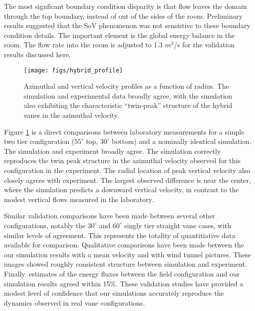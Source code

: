The most signficant boundary condition disparity is that
flow leaves the domain through the top boundary, instead of out
of the sides of the room. Preliminary results suggested that the SoV phenomenon 
was not sensistive to these boundary condition details. The important element is the 
global energy balance in the room. The flow rate into the room is adjusted to 
1.3 $m^3$/s for the validation results discussed here. 


  \begin{figure}[!htb]
    \begin{center}
     \texttt{[image: figs/hybrid\_profile]}
     \caption{Azimuthal and vertical velocity profiles as a function of
     radius. The simulation and experimental data broadly agree, with
     the simulation also exhibiting the characteristic ``twin-peak''
     structure of the hybrid vanes in the azimuthal velocity. }
     \label{fig:lab}
    \end{center}
  \end{figure}

Figure \ref{fig:lab} is a direct comparisons between laboratory measurements for a simple 
two tier configuration ($55^{\circ}$ top, $30^{\circ}$ bottom) and 
a nominally identical simulation. The simulation and experiment broadly agree. The simulation 
correctly reproduces the twin peak structure in the azimuthal velocity 
observed for this configuration in the experiment. The radial location of peak vertical velocity also 
closely agrees with experiment. The largest observed difference is near the center, where the simulation predicts 
a downward vertical velocity, in contrast to the modest vertical flows measured in the laboratory. 

Similar validation comparisons have been made between several other configurations, notably the $30^{\circ}$ 
and $60^{\circ}$ singly tier straight vane cases, with similar levels of agreement. 
This represents the totality of quantitiative data available for comparison. Qualitative comparisons have been made
between the our simulation results with a mean velocity and with wind tunnel pictures. These images showed
roughly consistent structure between simulation and experiment. Finally. estimates of the energy fluxes between
the field configuration and our simulation results agreed within 15\%. These validation studies have provided a modest 
level of confidence that our simulations accurately reproduce the dynamics observed in real 
vane configurations.

%
% 
%
% 
%
%
%
%


%
%

